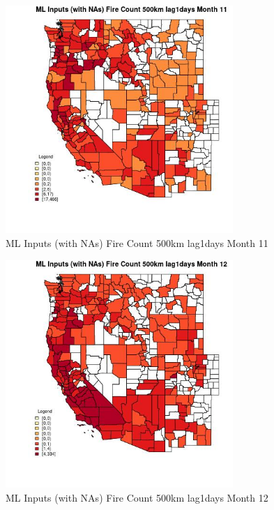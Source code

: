 \begin{figure} 
\centering  
\includegraphics[width=0.77\textwidth]{Code_Outputs/Report_ML_input_PM25_Step4_part_e_de_duplicated_aves_compiled_2019-05-21wNAs_CountyFire_Count_500km_lag1daysmedianMonth11.jpg} 
\caption{\label{fig:Report_ML_input_PM25_Step4_part_e_de_duplicated_aves_compiled_2019-05-21wNAsCountyFire_Count_500km_lag1daysmedianMonth11}ML Inputs (with NAs) Fire Count 500km lag1days Month 11} 
\end{figure} 
 

\begin{figure} 
\centering  
\includegraphics[width=0.77\textwidth]{Code_Outputs/Report_ML_input_PM25_Step4_part_e_de_duplicated_aves_compiled_2019-05-21wNAs_CountyFire_Count_500km_lag1daysmedianMonth12.jpg} 
\caption{\label{fig:Report_ML_input_PM25_Step4_part_e_de_duplicated_aves_compiled_2019-05-21wNAsCountyFire_Count_500km_lag1daysmedianMonth12}ML Inputs (with NAs) Fire Count 500km lag1days Month 12} 
\end{figure} 
 


